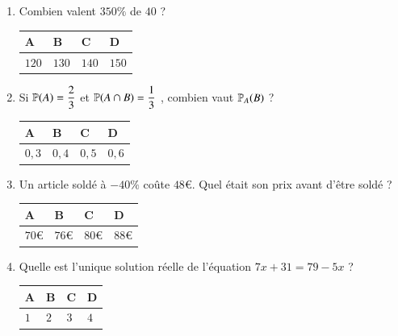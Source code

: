 \documentclass[oneside,12pt]{exam}          %
\begin{document}
\begin{enumerate}[label=\underline{Question \no\arabic*} :  , leftmargin=* , itemsep=5mm]
	\item Combien valent $350\%$ de $40$ ? 
	
		\hspace{\linewidth-\textwidth}
		\renewcommand{\arraystretch}{1.5}
		\begin{tabular}{| P{0.22\textwidth} | P{0.22\textwidth} | P{0.22\textwidth} | P{0.22\textwidth} |} \hline
			A & B & C & D \\ \hline
			$120$ & $130$ & $140$ & $150$ \\ \hline
		\end{tabular}



	\item Si ${\mathbb P}(A) = \dfrac{2}{3}$ et ${\mathbb P}(A \cap B) = \dfrac{1}{3}$ , combien vaut ${\mathbb P}_A(B)$ ?
	
		\hspace{\linewidth-\textwidth}
		\renewcommand{\arraystretch}{1.5}
		\begin{tabular}{| P{0.22\textwidth} | P{0.22\textwidth} | P{0.22\textwidth} | P{0.22\textwidth} |} \hline
			A & B & C & D \\ \hline
			$0,3$ & $0,4$ & $0,5$ & $0,6$ \\\hline
		\end{tabular}
		
		

	\item Un article soldé à $-40\%$ coûte $48$\euro. Quel était son prix avant d'être soldé ?
	
		\hspace{\linewidth-\textwidth}
		\renewcommand{\arraystretch}{1.5}
		\begin{tabular}{| P{0.22\textwidth} | P{0.22\textwidth} | P{0.22\textwidth} | P{0.22\textwidth} |} \hline
			A & B & C & D \\ \hline
			$70$\euro & $76$\euro & $80$\euro & $88$\euro \\\hline
		\end{tabular}
		
		

	\item Quelle est l'unique solution réelle de l'équation $7x + 31 = 79 - 5x$ ?
	
		\hspace{\linewidth-\textwidth}
		\renewcommand{\arraystretch}{1.5}
		\begin{tabular}{| P{0.22\textwidth} | P{0.22\textwidth} | P{0.22\textwidth} | P{0.22\textwidth} |} \hline
			A & B & C & D \\ \hline
			$1$ & $2$ & $3$ & $4$ \\ \hline
		\end{tabular}
		

\end{enumerate}
\end{document}
